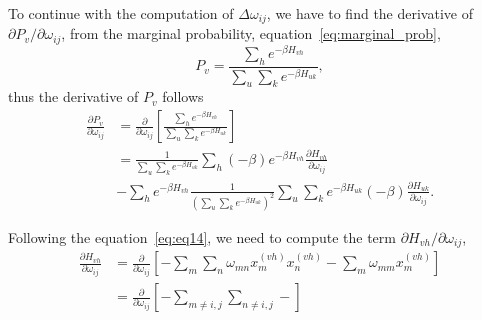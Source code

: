 To continue with the computation of $\Delta \omega_{ij}$, we have to find the derivative of $\partial P_{v}/\partial \omega_{ij}$, from the marginal probability, equation~\ref{eq:marginal_prob}, 
\begin{equation}
  P_{v} = \frac{\sum_{h} e^{-\beta H_{vh}}}{\sum_{u} \sum_{k} e^{-\beta H_{u k}}},
  \label{eq:marginal_prob_expansion}
\end{equation}
thus the derivative of $P_{v}$ follows
\begin{equation}
  \begin{split}
    \frac{\partial P_{v}}{\partial \omega_{ij}} & = \frac{\partial}{\partial \omega_{ij}} \left[ \frac{\sum_{h} e^{-\beta H_{vh}}}{\sum_{u} \sum_{k} e^{-\beta H_{u k}}} \right] \\
    & = \frac{1}{\sum_{u} \sum_{k} e^{-\beta H_{u k}}} \sum_{h} (-\beta) e^{-\beta H_{vh}} \frac{\partial H_{vh}}{\partial \omega_{ij}} \\
    & - \sum_{h} e^{-\beta H_{vh}} \frac{1}{{\left( \sum_{u} \sum_{k} e^{-\beta H_{u k}} \right)}^{2}} \sum_{u} \sum_{k} e^{-\beta H_{u k}} (-\beta) \frac{\partial H_{u k}}{\partial \omega_{ij}}.
  \end{split}
  \label{eq:eq14}
\end{equation}

Following the equation~\ref{eq:eq14}, we need to compute the term $\partial H_{vh}/\partial \omega_{ij}$,
\begin{equation}
  \begin{split}
      \frac{\partial H_{vh}}{\partial \omega_{ij}} & = \frac{\partial}{\partial \omega_{ij}} \left[ -\sum_{m} \sum_{n} \omega_{mn} x^{(vh)}_{m} x^{(vh)}_{n} - \sum_{m} \omega_{mm} x^{(vh)}_{m} \right] \\
                                              & = \frac{\partial}{\partial \omega_{ij}} \left[ -\sum_{m \neq i,j} \sum_{n \neq i,j} -  \right]
  \end{split}
\end{equation}




